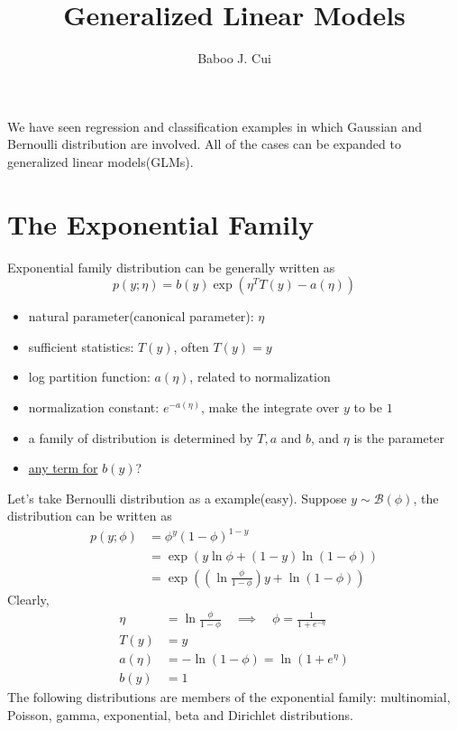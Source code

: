\documentclass[10pt,a4paper,oneside]{article}
\author{Baboo J. Cui}
\begin{document}
\title{Generalized Linear Models}
\maketitle

We have seen regression and classification examples in which Gaussian and Bernoulli distribution are involved. All of the cases can be expanded to generalized linear models(GLMs).

\section{The Exponential Family}
Exponential family distribution can be generally written as
\[
p(y; \eta) = b(y) \exp(\eta^T T(y) - a(\eta))
\]
\begin{itemize}
	\item natural parameter(canonical parameter): $\eta$
	\item sufficient statistics: $T(y)$, often $T(y) = y$
	\item log partition function: $a(\eta)$, related to normalization
	\item normalization constant: $e^{-a(\eta)}$, make the integrate over $y$ to be $1$
	\item a family of distribution is determined by $T,a$ and $b$, and $\eta$ is the parameter
	\item \underline{any term for} $b(y)$?
\end{itemize}
Let's take Bernoulli distribution as a example(easy). Suppose $y \sim \mathcal{B}(\phi)$, the distribution can be written as
\begin{align*}
p(y; \phi) &= \phi ^ y (1-\phi)^{1-y}\\
&= \exp(y \ln \phi + (1-y) \ln(1-\phi))\\
&= \exp \left(\left(\ln \frac{\phi}{1-\phi}\right)y+ \ln(1-\phi)\right)
\end{align*}
Clearly,
\begin{align*}
\eta &= \ln \frac{\phi}{1-\phi} \quad \implies \quad \phi= \frac{1}{1+e^{-\eta}}\\
T(y) &= y\\
a(\eta) &= -\ln (1-\phi) = \ln (1+e^\eta)\\
b(y) &= 1
\end{align*}
The following distributions are members of the exponential family: multinomial, Poisson, gamma, exponential, beta and Dirichlet distributions.
\end{document}
